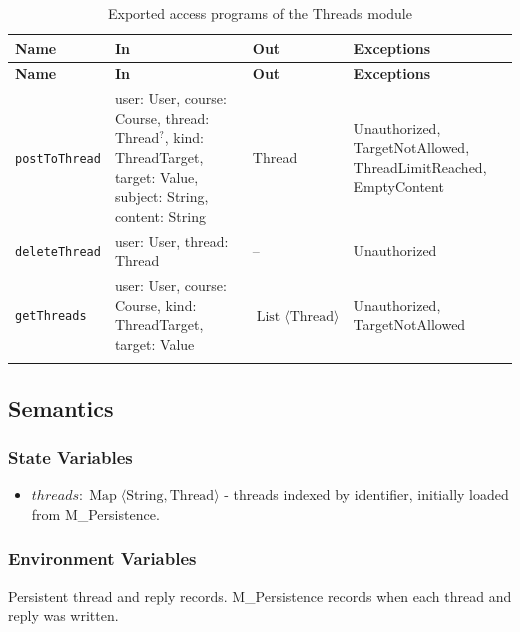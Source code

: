 \documentclass[12pt, titlepage]{article}
\begin{document}
\begingroup
\small
\setlength{\tabcolsep}{4pt}
\renewcommand{\arraystretch}{1.2}
\begin{longtable}{>{\raggedright\arraybackslash}p{}
                  >{\raggedright\arraybackslash}p{}
                  >{\raggedright\arraybackslash}p{}
                  >{\raggedright\arraybackslash}p{}}
\toprule
\textbf{Name} & \textbf{In} & \textbf{Out} & \textbf{Exceptions} \\
\midrule
\endfirsthead
\toprule
\textbf{Name} & \textbf{In} & \textbf{Out} & \textbf{Exceptions} \\
\midrule
\endhead
\endfoot
\texttt{postToThread} & user: User, course: Course, thread: Thread$^{?}$, kind: ThreadTarget, target: Value, subject: String, content: String & Thread & Unauthorized, TargetNotAllowed, ThreadLimitReached, EmptyContent \\
\texttt{deleteThread} & user: User, thread: Thread & -- & Unauthorized \\
\texttt{getThreads} & user: User, course: Course, kind: ThreadTarget, target: Value & $\operatorname{List}\langle\text{Thread}\rangle$ & Unauthorized, TargetNotAllowed \\
\bottomrule
\caption{Exported access programs of the Threads module}
\label{TblThreadsAccessPrograms}
\end{longtable}
\endgroup

\subsection{Semantics}

\subsubsection{State Variables}

\begin{itemize}
    \item $\mathit{threads}:\operatorname{Map}\langle\text{String},\text{Thread}\rangle$ - threads indexed by identifier, initially loaded from M\_Persistence.
\end{itemize}

\subsubsection{Environment Variables}

Persistent thread and reply records. M\_Persistence records when each thread and reply was written.
\end{document}
